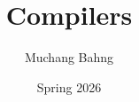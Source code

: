 \documentclass{article}
\newcounter{code}[section]
\begin{document}
\title{Compilers}
\author{Muchang Bahng}
\date{Spring 2026}

\maketitle
\tableofcontents
\pagebreak 




 




% 
\end{document}
